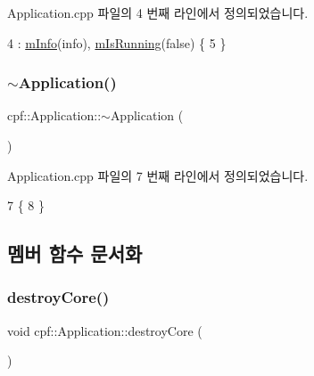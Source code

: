 Application.\+cpp 파일의 4 번째 라인에서 정의되었습니다.


\begin{DoxyCode}
4                                                               : \hyperlink{classcpf_1_1_application_aeef620fe71f2ac891e3650d6d3462b28}{mInfo}(info), 
      \hyperlink{classcpf_1_1_application_a84a6e2bafcc39719acee9885a064ac75}{mIsRunning}(\textcolor{keyword}{false}) \{
5     \}
\end{DoxyCode}
\mbox{\label{classcpf_1_1_application_ad018a98c533cbf877ae11a05b329c4a2}} 
\subsubsection{\texorpdfstring{$\sim$\+Application()}{~Application()}}
{\footnotesize\ttfamily cpf\+::\+Application\+::$\sim$\+Application (\begin{DoxyParamCaption}{ }\end{DoxyParamCaption})\hspace{0.3cm}{\ttfamily [virtual]}}



Application.\+cpp 파일의 7 번째 라인에서 정의되었습니다.


\begin{DoxyCode}
7                               \{
8     \}
\end{DoxyCode}


\subsection{멤버 함수 문서화}
\mbox{\label{classcpf_1_1_application_aa65f415f1e0866cab063d83ab428ebbc}} 
\subsubsection{\texorpdfstring{destroy\+Core()}{destroyCore()}}
{\footnotesize\ttfamily void cpf\+::\+Application\+::destroy\+Core (\begin{DoxyParamCaption}{ }\end{DoxyParamCaption})\hspace{0.3cm}{\ttfamily [private]}}



